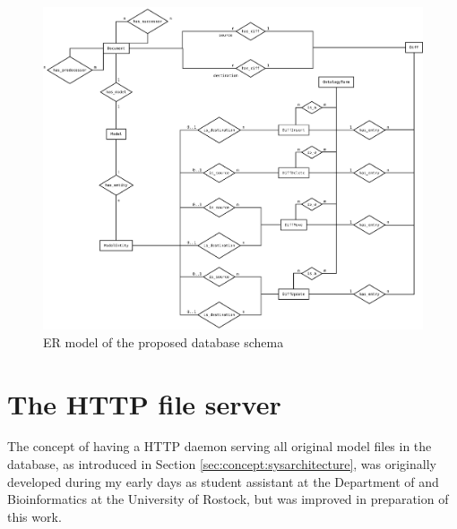 \begin{figure}
	\centering
	\includegraphics[width=\textwidth]{resources/db-concept-er.pdf}
	\caption{ER model of the proposed database schema}
	\label{fig:db-er-model}
\end{figure}


\section{The HTTP file server}
\label{sec:concept:filestorage}

The concept of having a HTTP daemon serving all original model files in the \masymos database, as introduced in Section \ref{sec:concept:sysarchitecture}, was originally developed during my early days as student assistant at the Department of \sysbio and Bioinformatics at the University of Rostock, but was improved in preparation of this work.

